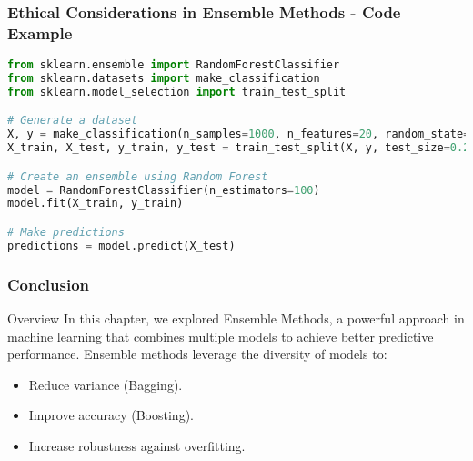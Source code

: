 \documentclass[aspectratio=169]{beamer}
\begin{document}
\begin{frame}
    \frametitle{Ethical Considerations in Ensemble Methods - Code Example}
    \begin{lstlisting}[language=Python]
from sklearn.ensemble import RandomForestClassifier
from sklearn.datasets import make_classification
from sklearn.model_selection import train_test_split

# Generate a dataset
X, y = make_classification(n_samples=1000, n_features=20, random_state=42)
X_train, X_test, y_train, y_test = train_test_split(X, y, test_size=0.2)

# Create an ensemble using Random Forest
model = RandomForestClassifier(n_estimators=100)
model.fit(X_train, y_train)

# Make predictions
predictions = model.predict(X_test)
    \end{lstlisting}
\end{frame}

\begin{frame}[fragile]
    \frametitle{Conclusion}
    \begin{block}{Overview}
        In this chapter, we explored Ensemble Methods, a powerful approach in machine learning that combines multiple models to achieve better predictive performance. 
        Ensemble methods leverage the diversity of models to:
        \begin{itemize}
            \item Reduce variance (Bagging).
            \item Improve accuracy (Boosting).
            \item Increase robustness against overfitting.
        \end{itemize}
    \end{block}
\end{frame}
\end{document}
